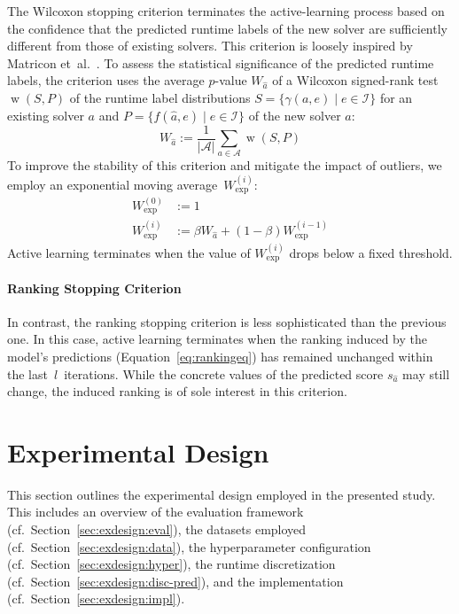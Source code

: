 \documentclass[sn-basic, Numbered]{sn-jnl} %
\begin{document}
The Wilcoxon stopping criterion terminates the active-learning process based on the confidence that the predicted runtime labels of the new solver are sufficiently different from those of existing solvers.
This criterion is loosely inspired by Matricon et~al.~\cite{MatriconAFSH21}.
To assess the statistical significance of the predicted runtime labels, the criterion uses the average $p$-value $W_{\hat{a}}$ of a Wilcoxon signed-rank test $\operatorname{w}(S,P)$ of the runtime label distributions ${S=\{ \gamma(a, e) \mid e \in \mathcal{I} \}}$ for an existing solver $a$ and \mbox{$P=\{ f(\hat a, e) \mid e \in \mathcal{I} \}$} of the new solver $\hat{a}$:
%
\begin{equation*}
  W_{\hat{a}} := \frac{1}{\lvert \mathcal{A} \rvert} \sum_{a \in \mathcal{A}} \operatorname{w}(S, P)
\end{equation*}
%
To improve the stability of this criterion and mitigate the impact of outliers, we employ an exponential moving average~$W^{(i)}_{\exp}$:
%
\begin{align*}
  W_{\exp}^{\left(0\right)} &:= 1\\
  W_{\exp}^{\left(i\right)} &:= \beta W_{\hat{a}} + \left(1 - \beta\right) W_{\exp}^{\left(i - 1\right)}
\end{align*}
%
Active learning terminates when the value of $W^{(i)}_{\exp}$ drops below a fixed threshold.

\paragraph{Ranking Stopping Criterion}

In contrast, the ranking stopping criterion is less sophisticated than the previous one.
In this case, active learning terminates when the ranking induced by the model's predictions (Equation~\eqref{eq:rankingeq}) has remained unchanged within the last~$l$~iterations.
While the concrete values of the predicted score $s_{\hat a}$ may still change, the induced ranking is of sole interest in this criterion.

\section{Experimental Design}
\label{sec:exdesign}

This section outlines the experimental design employed in the presented study.
This includes an overview of the evaluation framework (cf.~Section~\ref{sec:exdesign:eval}), the datasets employed (cf.~Section~\ref{sec:exdesign:data}), the hyperparameter configuration (cf.~Section~\ref{sec:exdesign:hyper}), the runtime discretization (cf.~Section~\ref{sec:exdesign:disc-pred}), and the implementation (cf.~Section~\ref{sec:exdesign:impl}).
\end{document}
